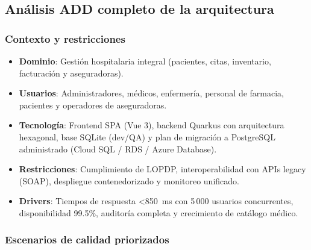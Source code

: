\documentclass[12pt,a4paper]{article}
\begin{document}
\subsection{Análisis ADD completo de la arquitectura}

\subsubsection{Contexto y restricciones}

\begin{itemize}[leftmargin=1.2cm]
    \item \textbf{Dominio}: Gestión hospitalaria integral (pacientes, citas, inventario, facturación y aseguradoras).
    \item \textbf{Usuarios}: Administradores, médicos, enfermería, personal de farmacia, pacientes y operadores de aseguradoras.
    \item \textbf{Tecnología}: Frontend SPA (Vue 3), backend Quarkus con arquitectura hexagonal, base SQLite (dev/QA) y plan de migración a PostgreSQL administrado (Cloud SQL / RDS / Azure Database).
    \item \textbf{Restricciones}: Cumplimiento de LOPDP, interoperabilidad con APIs legacy (SOAP), despliegue contenedorizado y monitoreo unificado.
    \item \textbf{Drivers}: Tiempos de respuesta <850~ms con 5\,000 usuarios concurrentes, disponibilidad 99.5\%, auditoría completa y crecimiento de catálogo médico.
\end{itemize}

\subsubsection{Escenarios de calidad priorizados}
\end{document}
